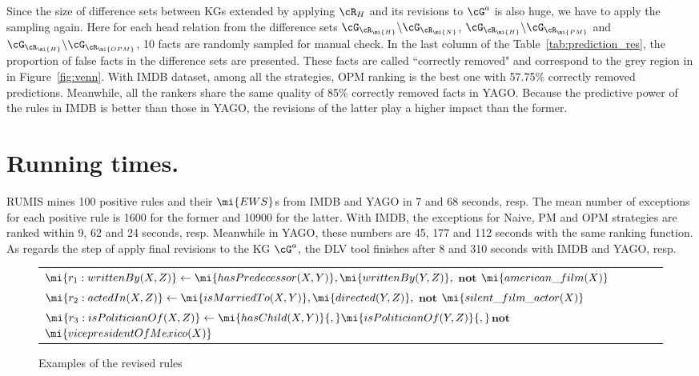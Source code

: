 Since the size of difference sets between KGs extended by applying $\cR_H$ and its revisions to $\cG^a$ is also huge, we have to apply the sampling again. Here for each head relation from the difference sets $\cG_{\cR_\mi{H}}\backslash \cG_{\cR_{\mi{N}}}$, $\cG_{\cR_\mi{H}}\backslash \cG_{\cR_{\mi{PM}}}$ and $\cG_{\cR_\mi{H}}\backslash \cG_{\cR_{\mi{OPM}}}$, 10 facts are randomly sampled for manual check. In the last column of the Table~\ref{tab:prediction_res}, the proportion of false facts in the difference sets are presented. These facts are called ``correctly removed" and correspond to the grey region in in Figure~\ref{fig:venn}. With IMDB dataset, among all the strategies, OPM ranking is the best one with 57.75\% correctly removed predictions. Meanwhile, all the rankers share the same quality of 85\% correctly removed facts in YAGO. Because the predictive power of the rules in IMDB is better than those in YAGO, the revisions of the latter play a higher impact than the former.

\section{Running times.}

RUMIS mines 100 positive rules and their $\mi{EWS}$s from IMDB and YAGO in 7 and 68 seconds, resp. The mean number of exceptions for each positive rule is 1600 for the former and 10900 for the latter. With IMDB, the exceptions for Naive, PM and OPM strategies are ranked within 9, 62 and 24 seconds, resp. Meanwhile in YAGO, these numbers are 45, 177 and 112 seconds with the same ranking function. As regards the step of apply final revisions to the KG $\cG^a$, the DLV tool finishes after 8 and 310 seconds with IMDB and YAGO, resp.

\begin{figure}[t]
    \centering
   
    \vspace{-.2cm}
    \begin{tabular}{l}
 {\scriptsize
        $\mi{r_1: writtenBy(X, Z)}  \leftarrow
        \mi{hasPredecessor(X, Y)},\mi{writtenBy(Y, Z)},$ $ \textbf{not}$  $\mi{american\_film(X)} $}\\        
       {\scriptsize 
$\mi{r_2:  actedIn(X, Z)}  \leftarrow
        \mi{isMarriedTo(X, Y)},\mi{directed(Y, Z)},$ $ \textbf{not}$  $\mi{silent\_film\_actor(X)} $} \\
          {\scriptsize 
$\mi{r_3:  isPoliticianOf(X, Z)}  \leftarrow
        \mi{hasChild(X, Y)}{,}\mi{isPoliticianOf(Y, Z)}{,}$$ \textbf{not}$  $\mi{vicepresidentOfMexico(X)} $} \\
 \end{tabular}            
    \caption{Examples of the revised rules}
 \label{fig:examplerules}
 \vspace{-.4cm}
\end{figure}

